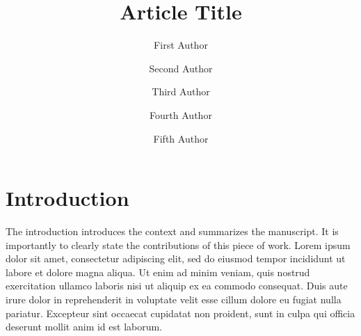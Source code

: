 \documentclass[unnumsec,webpdf,modern,large]{mam-authoring-template}%
\theoremstyle{thmstyleone}%
\theoremstyle{thmstyletwo}%
\theoremstyle{thmstylethree}%
\begin{document}



\title[Short Article Title]{Article Title}

\author[1,$\ast$]{First Author}
\author[2]{Second Author}
\author[3]{Third Author}
\author[3]{Fourth Author}
\author[4]{Fifth Author}


\address[1]{, , }
\address[2]{, , }
\address[3]{, , }
\address[4]{, , }





\maketitle


\section{Introduction}
The introduction introduces the context and summarizes the manuscript. It is importantly to clearly state the contributions
of this piece of work. Lorem ipsum dolor sit amet, consectetur adipiscing elit, sed do eiusmod tempor incididunt ut labore et dolore magna aliqua. Ut enim ad minim veniam, quis nostrud exercitation ullamco laboris nisi ut aliquip ex ea commodo consequat. Duis aute irure dolor in reprehenderit in voluptate velit esse cillum dolore eu fugiat nulla pariatur. Excepteur sint occaecat cupidatat non proident, sunt in culpa qui officia deserunt mollit anim id est laborum.
\end{document}
